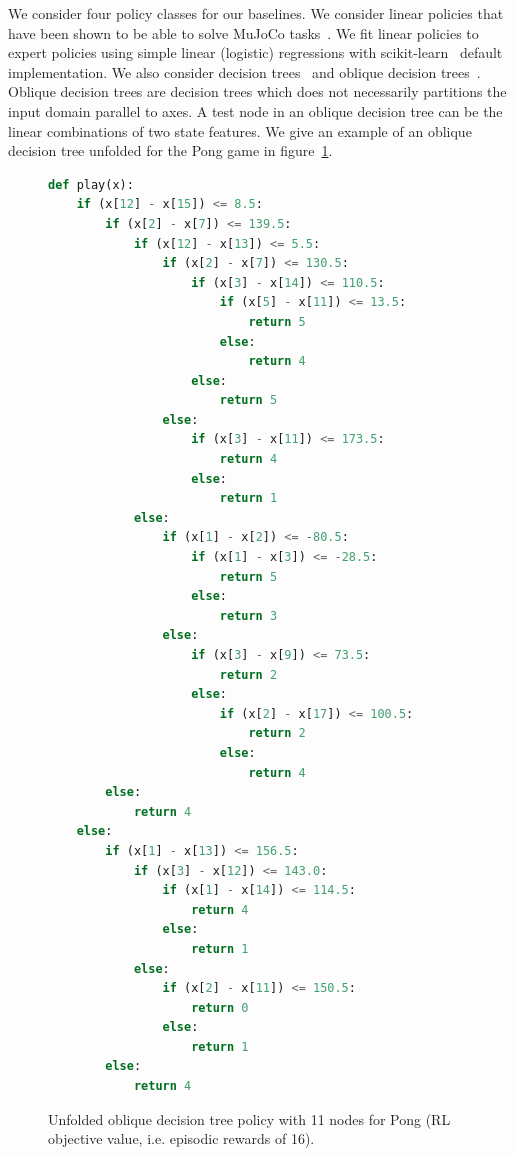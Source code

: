 We consider four policy classes for our baselines.
We consider linear policies that have been shown to be able to solve MuJoCo tasks~\cite{empirical-evidence}.
We fit linear policies to expert policies using simple linear (logistic) regressions with scikit-learn~\cite{scikit-learn} default implementation.
We also consider decision trees~\cite{breiman1984classification} and oblique decision trees~\cite{murthy1994system}.
Oblique decision trees are decision trees which does not necessarily partitions the input domain parallel to axes.
A test node in an oblique decision tree can be the linear combinations of two state features.
We give an example of an oblique decision tree unfolded for the Pong game in figure~\ref{lst:pong}.
\begin{figure}
  \centering
  \begin{minipage}{0.47\textwidth}
  \begin{lstlisting}[language=Python,style=mystyle]
  def play(x):
    if (x[12] - x[15]) <= 8.5:
        if (x[2] - x[7]) <= 139.5:
            if (x[12] - x[13]) <= 5.5:
                if (x[2] - x[7]) <= 130.5:
                    if (x[3] - x[14]) <= 110.5:
                        if (x[5] - x[11]) <= 13.5:
                            return 5
                        else:
                            return 4
                    else:
                        return 5
                else:
                    if (x[3] - x[11]) <= 173.5:
                        return 4
                    else:
                        return 1
            else:
                if (x[1] - x[2]) <= -80.5:
                    if (x[1] - x[3]) <= -28.5:
                        return 5
                    else:
                        return 3
                else:
                    if (x[3] - x[9]) <= 73.5:
                        return 2
                    else:
                        if (x[2] - x[17]) <= 100.5:
                            return 2
                        else:
                            return 4
        else:
            return 4
    else:
        if (x[1] - x[13]) <= 156.5:
            if (x[3] - x[12]) <= 143.0:
                if (x[1] - x[14]) <= 114.5:
                    return 4
                else:
                    return 1
            else:
                if (x[2] - x[11]) <= 150.5:
                    return 0
                else:
                    return 1
        else:
            return 4
  \end{lstlisting}
  \caption{Unfolded oblique decision tree policy with 11 nodes for Pong (RL objective value, i.e. episodic rewards of 16).}\label{lst:pong}

\end{minipage}
\end{figure}
